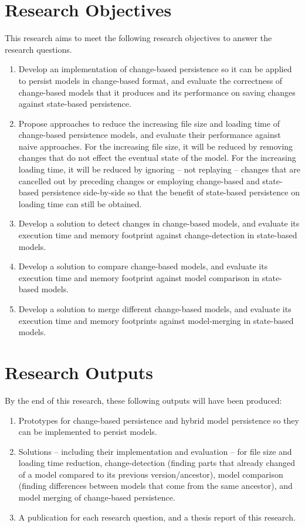 \documentclass[12pt, a4paper]{report} \usepackage[titletoc]{appendix}
\begin{document}
\section{Research Objectives}
\label{sec:research_objectives}
This research aims to meet the following research objectives to answer the research questions.
\begin{enumerate}
	\item Develop an implementation of change-based persistence so it can be applied to persist models in change-based format, and evaluate the correctness of change-based models that it produces and its performance on saving changes against state-based persistence. 
	\item Propose approaches to reduce the increasing file size and loading time of change-based persistence models, and evaluate their performance against naive approaches. For the increasing file size, it will be reduced by removing changes that do not effect the eventual state of the model. For the increasing loading time, it will be reduced by ignoring -- not replaying -- changes that are cancelled out by preceding changes or employing change-based and state-based persistence side-by-side so that the benefit of state-based persistence on loading time can still be obtained.    
    \item Develop a solution to detect changes in change-based models, and evaluate its execution time and memory footprint against change-detection in state-based models.
	\item Develop a solution to compare change-based models, and evaluate its execution time and memory footprint against model comparison in state-based models.
	\item Develop a solution to merge different change-based models, and evaluate its execution time and memory footprints against model-merging in state-based models. 
\end{enumerate}

\section{Research Outputs}
\label{sec:research_outputs}
By the end of this research, these following outputs will have been produced:
\begin{enumerate}
	\item Prototypes for change-based persistence and hybrid model persistence so they can be implemented to persist models. 
	\item Solutions -- including their implementation and evaluation -- for file size and loading time reduction, change-detection (finding parts that already changed of a model compared to its previous version/ancestor), model comparison (finding differences between models that come from the same ancestor), and model merging of change-based persistence.
	\item A publication for each research question, and a thesis report of this research. 
\end{enumerate}
\end{document}
